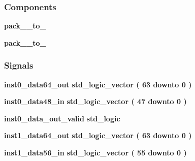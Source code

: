 \subsubsection*{Components}
 \begin{DoxyCompactItemize}
\item 
{\bf pack\+\_\+\_\+to\+\_}  {\bfseries }  
\item 
{\bf pack\+\_\+\_\+to\+\_}  {\bfseries }  
\end{DoxyCompactItemize}
\subsubsection*{Signals}
 \begin{DoxyCompactItemize}
\item 
{\bf inst0\+\_\+data64\+\_\+out} {\bfseries \textcolor{comment}{std\+\_\+logic\+\_\+vector}\textcolor{vhdlchar}{ }\textcolor{vhdlchar}{(}\textcolor{vhdlchar}{ }\textcolor{vhdlchar}{ } \textcolor{vhdldigit}{63} \textcolor{vhdlchar}{ }\textcolor{keywordflow}{downto}\textcolor{vhdlchar}{ }\textcolor{vhdlchar}{ } \textcolor{vhdldigit}{0} \textcolor{vhdlchar}{ }\textcolor{vhdlchar}{)}\textcolor{vhdlchar}{ }} 
\item 
{\bf inst0\+\_\+data48\+\_\+in} {\bfseries \textcolor{comment}{std\+\_\+logic\+\_\+vector}\textcolor{vhdlchar}{ }\textcolor{vhdlchar}{(}\textcolor{vhdlchar}{ }\textcolor{vhdlchar}{ } \textcolor{vhdldigit}{47} \textcolor{vhdlchar}{ }\textcolor{keywordflow}{downto}\textcolor{vhdlchar}{ }\textcolor{vhdlchar}{ } \textcolor{vhdldigit}{0} \textcolor{vhdlchar}{ }\textcolor{vhdlchar}{)}\textcolor{vhdlchar}{ }} 
\item 
{\bf inst0\+\_\+data\+\_\+out\+\_\+valid} {\bfseries \textcolor{comment}{std\+\_\+logic}\textcolor{vhdlchar}{ }} 
\item 
{\bf inst1\+\_\+data64\+\_\+out} {\bfseries \textcolor{comment}{std\+\_\+logic\+\_\+vector}\textcolor{vhdlchar}{ }\textcolor{vhdlchar}{(}\textcolor{vhdlchar}{ }\textcolor{vhdlchar}{ } \textcolor{vhdldigit}{63} \textcolor{vhdlchar}{ }\textcolor{keywordflow}{downto}\textcolor{vhdlchar}{ }\textcolor{vhdlchar}{ } \textcolor{vhdldigit}{0} \textcolor{vhdlchar}{ }\textcolor{vhdlchar}{)}\textcolor{vhdlchar}{ }} 
\item 
{\bf inst1\+\_\+data56\+\_\+in} {\bfseries \textcolor{comment}{std\+\_\+logic\+\_\+vector}\textcolor{vhdlchar}{ }\textcolor{vhdlchar}{(}\textcolor{vhdlchar}{ }\textcolor{vhdlchar}{ } \textcolor{vhdldigit}{55} \textcolor{vhdlchar}{ }\textcolor{keywordflow}{downto}\textcolor{vhdlchar}{ }\textcolor{vhdlchar}{ } \textcolor{vhdldigit}{0} \textcolor{vhdlchar}{ }\textcolor{vhdlchar}{)}\textcolor{vhdlchar}{ }} 

\end{DoxyCompactItemize}
